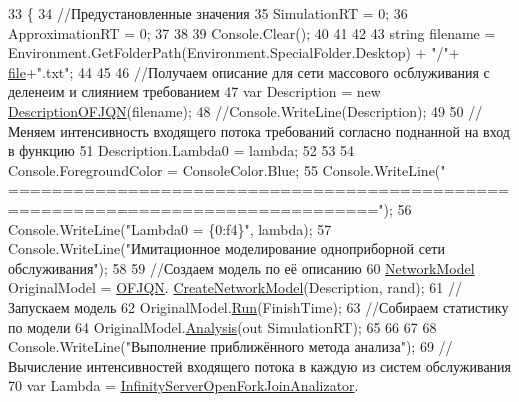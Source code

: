 \begin{DoxyCode}
33         \{
34             \textcolor{comment}{//Предустановленные значения}
35             SimulationRT = 0; 
36             ApproximationRT = 0; 
37 
38 
39             Console.Clear(); 
40 
41 
42 
43             \textcolor{keywordtype}{string} filename = Environment.GetFolderPath(Environment.SpecialFolder.Desktop) + \textcolor{stringliteral}{"/"}+
      \hyperlink{class_analysis_1_1_program_abbd153e2a54cae09e6cbb7092163857f}{file}+\textcolor{stringliteral}{".txt"};
44 
45 
46             \textcolor{comment}{//Получаем описание для сети массового осблуживания с деленеим и слиянием требованием}
47             var Description = \textcolor{keyword}{new} \hyperlink{class_network_descriptions_1_1_description_o_f_j_q_n}{DescriptionOFJQN}(filename); 
48             \textcolor{comment}{//Console.WriteLine(Description); }
49 
50             \textcolor{comment}{//Меняем интенсивность входящего потока требований согласно поднанной на вход в функцию}
51             Description.Lambda0 = lambda; 
52 
53 
54             Console.ForegroundColor = ConsoleColor.Blue;
55             Console.WriteLine(\textcolor{stringliteral}{"
      ================================================================================"});
56             Console.WriteLine(\textcolor{stringliteral}{"Lambda0 = \{0:f4\}"}, lambda); 
57             Console.WriteLine(\textcolor{stringliteral}{"Имитационное моделирование одноприборной сети обслуживания"});
58 
59             \textcolor{comment}{//Создаем модель по её описанию }
60             \hyperlink{class_network_simulator_1_1_network_model}{NetworkModel} OriginalModel = \hyperlink{class_network_simulator_1_1_o_f_j_q_n}{OFJQN}.
      \hyperlink{class_network_simulator_1_1_o_f_j_q_n_a6d0939bfdf0bc3c0b96269169506c454}{CreateNetworkModel}(Description, rand); 
61             \textcolor{comment}{//Запускаем модель}
62             OriginalModel.\hyperlink{class_network_simulator_1_1_network_model_a79f12b7c4dc35f16f98bf59e06341e79}{Run}(FinishTime); 
63             \textcolor{comment}{//Собираем статистику по модели}
64             OriginalModel.\hyperlink{class_network_simulator_1_1_network_model_ab2526f51714e4ead297180cc391449a2}{Analysis}(out SimulationRT); 
65 
66            
67 
68             Console.WriteLine(\textcolor{stringliteral}{"Выполнение приближённого метода анализа"});
69             \textcolor{comment}{//Вычисление интенсивностей входящего потока в каждую из систем обслуживания}
70             var Lambda = \hyperlink{class_exact_network_analysis_1_1_infinity_server_open_fork_join_analizator}{InfinityServerOpenForkJoinAnalizator}.

\end{DoxyCode}
